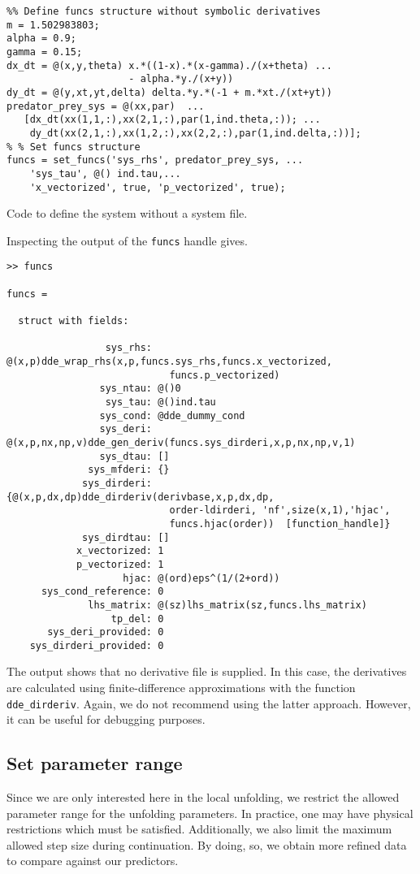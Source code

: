 \begin{listing}[h!]
\begin{verbatim}
%% Define funcs structure without symbolic derivatives
m = 1.502983803;
alpha = 0.9;
gamma = 0.15;
dx_dt = @(x,y,theta) x.*((1-x).*(x-gamma)./(x+theta) ...
                     - alpha.*y./(x+y))
dy_dt = @(y,xt,yt,delta) delta.*y.*(-1 + m.*xt./(xt+yt))
predator_prey_sys = @(xx,par)  ...
   [dx_dt(xx(1,1,:),xx(2,1,:),par(1,ind.theta,:)); ...
    dy_dt(xx(2,1,:),xx(1,2,:),xx(2,2,:),par(1,ind.delta,:))];
% % Set funcs structure
funcs = set_funcs('sys_rhs', predator_prey_sys, ...
    'sys_tau', @() ind.tau,...
    'x_vectorized', true, 'p_vectorized', true);
\end{verbatim}
\caption{Code to define the system without a system file.}
\label{sm:lst:wo_system_file}
\end{listing}
Inspecting the output of the \texttt{funcs} handle gives.
\begin{verbatim}
>> funcs

funcs =

  struct with fields:

                 sys_rhs: @(x,p)dde_wrap_rhs(x,p,funcs.sys_rhs,funcs.x_vectorized,
                            funcs.p_vectorized)
                sys_ntau: @()0
                 sys_tau: @()ind.tau
                sys_cond: @dde_dummy_cond
                sys_deri: @(x,p,nx,np,v)dde_gen_deriv(funcs.sys_dirderi,x,p,nx,np,v,1)
                sys_dtau: []
              sys_mfderi: {}
             sys_dirderi: {@(x,p,dx,dp)dde_dirderiv(derivbase,x,p,dx,dp,
                            order-ldirderi, 'nf',size(x,1),'hjac',
                            funcs.hjac(order))  [function_handle]}
             sys_dirdtau: []
            x_vectorized: 1
            p_vectorized: 1
                    hjac: @(ord)eps^(1/(2+ord))
      sys_cond_reference: 0
              lhs_matrix: @(sz)lhs_matrix(sz,funcs.lhs_matrix)
                  tp_del: 0
       sys_deri_provided: 0
    sys_dirderi_provided: 0
\end{verbatim}
The output shows that no derivative file is supplied. In this case, the
derivatives are calculated using finite-difference approximations with the
function \texttt{dde_dirderiv}. Again, we do not recommend using the latter
approach. However, it can be useful for debugging purposes.

\subsection{Set parameter range}
Since we are only interested here in the local unfolding, we restrict the
allowed parameter range for the unfolding parameters. In practice, one may have
physical restrictions which must be satisfied. Additionally, we also limit the
maximum allowed step size during continuation. By doing, so, we obtain more refined
data to compare against our predictors.
\inputminted[firstline=37, lastline=40]{MATLAB}{\pathToDDEBifToolDemos/predator_prey/predator_prey.m}


